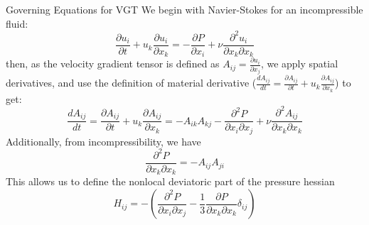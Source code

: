 \documentclass[pdf,9pt]{beamer}
\newcommand{\<}{\langle}
\renewcommand{\>}{\rangle}
\begin{document}


\begin{frame}{Governing Equations for VGT}
  We begin with Navier-Stokes for an incompressible fluid:
  \begin{equation} \label{eq:NS}
    \frac{\partial u_i}{\partial t} + u_k \frac{\partial u_i}{\partial x_k} = -\frac{\partial P}{\partial x_i} + \nu \frac{\partial^2 u_i}{\partial x_k \partial x_k}
  \end{equation}
  then, as the velocity gradient tensor is defined as $A_{ij} = \frac{\partial u_i}{\partial x_j}$, we apply spatial derivatives, and use the definition of material derivative ($\frac{dA_{ij}}{dt} = \frac{\partial A_{ij}}{\partial t} + u_k\frac{\partial A_{ij}}{\partial x_k}$) to get:
  \begin{equation}
    \frac{dA_{ij}}{dt} = \frac{\partial A_{ij}}{\partial t} + u_k \frac{\partial A_{ij}}{\partial x_k} = - A_{ik}A_{kj} - \frac{\partial^2 P}{\partial x_i \partial x_j} + \nu \frac{\partial^2 A_{ij}}{\partial x_k \partial x_k}
  \end{equation}
  Additionally, from incompressibility, we have
  \begin{equation}
    \frac{\partial^2 P}{\partial x_k \partial x_k} = - A_{ij}A_{ji}
  \end{equation}
  This allows us to define the nonlocal deviatoric part of the pressure hessian
  \begin{equation}
    H_{ij} = - \left( \frac{\partial^2 P}{\partial x_i \partial x_j} - \frac{1}{3}\frac{\partial P}{\partial x_k \partial x_k}\delta_{ij}  \right)
  \end{equation}
\end{frame}


\end{document}
